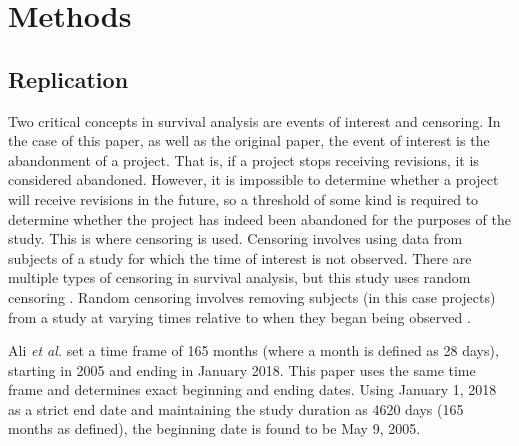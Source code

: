 \documentclass[acmconf]{acmart}
\begin{document}

\section{Methods}

\subsection{Replication}

Two critical concepts in survival analysis are events of interest and censoring.
In the case of this paper, as well as the original paper, the event of interest is the abandonment of a project.
That is, if a project stops receiving revisions, it is considered abandoned.
However, it is impossible to determine whether a project will receive revisions in the future, so a threshold of some kind is required to determine whether the project has indeed been abandoned for the purposes of the study.
This is where censoring is used.
Censoring involves using data from subjects of a study for which the time of interest is not observed.
There are multiple types of censoring in survival analysis, but this study uses random censoring .
Random censoring involves removing subjects (in this case projects) from a study at varying times relative to when they began being observed \cite{renganathan2016overview}. 

Ali \emph{et al.} set a time frame of 165 months (where a month is defined as 28 days), starting in 2005 and ending in January 2018.
This paper uses the same time frame and determines exact beginning and ending dates.
Using January 1, 2018 as a strict end date and maintaining the study duration as 4620 days (165 months as defined), the beginning date is found to be May 9, 2005.
\end{document}
